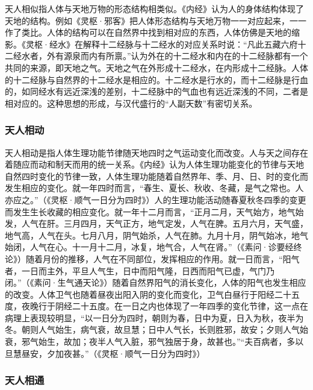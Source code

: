 \documentclass[draft,12pt]{ctexbook}
\begin{document}
天人相似指人体与天地万物的形态结构相类似。《内经》认为人的身体结构体现了天地的结构。例如《灵枢·邪客》把人体形态结构与天地万物一一对应起来，一一作了类比。人体的结构可以在自然界中找到相对应的东西，人体仿佛是天地的缩影。《灵枢·经水》在解释十二经脉与十二经水的对应关系时说：“凡此五藏六府十二经水者，外有源泉而内有所禀。”认为外在的十二经水和内在的十二经脉都有一个共同的来源，即天地之气。天地之气在外形成十二经水，在内形成十二经脉。人体的十二经脉与自然界的十二经水是相应的。十二经水是行水的，而十二经脉是行血的，如同经水有远近深浅的差别，十二经脉中的气血也有远近深浅的不同，二者是相对应的。这种思想的形成，与汉代盛行的“人副天数”有密切关系。

\subsubsection{天人相动}%

天人相动是指人体生理功能节律随天地四时之气运动变化而改变。人与天之间存在着随应而动和制天而用的统一关系。《内经》认为人体生理功能变化的节律与天地自然四时变化的节律一致，人体生理功能随着自然界年、季、月、日、时的变化而发生相应的变化。就一年四时而言，“春生、夏长、秋收、冬藏，是气之常也。人亦应之。”（《灵枢·顺气一日分为四时》）人的生理功能活动随春夏秋冬四季的变更而发生生长收藏的相应变化。就一年十二月而言，“正月二月，天气始方，地气始发，人气在肝。三月四月，天气正方，地气定发，人气在脾。五月六月，天气盛，地气高，人气在头。七月八月，阴气始杀，人气在肺。九月十月，阴气始冰，地气始闭，人气在心。十一月十二月，冰复，地气合，人气在肾。”（《素问·诊要经终论》）随着月份的推移，人气在不同部位，发挥相应的作用。就一日而言，“阳气者，一日而主外，平旦人气生，日中而阳气隆，日西而阳气已虚，气门乃闭。”（《素问·生气通天论》）随着自然界阳气的消长变化，人体的阳气也发生相应的改变。人体卫气也随着昼夜出阳入阴的变化而变化，卫气白昼行于阳经二十五度，夜晚行于阴经二十五度。在一日之内也体现了一年四季的变化节律，这一点在病理上表现较明显，“以一日分为四时，朝则为春，日中为夏，日入为秋，夜半为冬。朝则人气始生，病气衰，故旦慧；日中人气长，长则胜邪，故安；夕则人气始衰，邪气始生，故加；夜半人气入脏，邪气独居于身，故甚也。”“夫百病者，多以旦慧昼安，夕加夜甚。”（《灵枢·顺气一日分为四时》）

\subsubsection{天人相通}%
\end{document}
